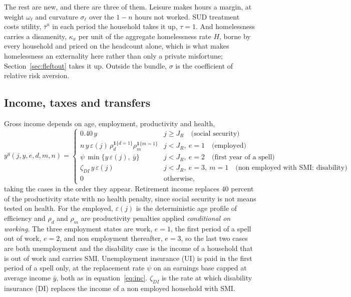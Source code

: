 \documentclass[10pt]{article}
\begin{document}
The rest are new, and there are three of them. Leisure makes hours a margin,
at weight $\omega_{\ell}$ and curvature $\sigma_{\ell}$ over the $1-n$ hours
not worked. SUD treatment costs utility, $\bar\tau^{u}$ in each
period the household takes it up, $\tau=1$. And homelessness carries a
disamenity, $\kappa_x$ per unit of the aggregate homelessness rate $H$, borne by
every household and priced on the headcount alone, which is what makes
homelessness an externality here rather than only a private misfortune;
Section~\ref{sec:fleftout} takes it up. Outside the bundle, $\sigma$ is the
coefficient of relative risk aversion.

\subsection{Income, taxes and transfers}\label{sec:ftaxes}

Gross income depends on age, employment, productivity and health,
\begin{equation}\label{eq:fincome}
y^{g}(j,y,e,d,m,n)=
\begin{cases}
0.40\,y & j\ge J_{R} \quad\text{(social security)}\\[2pt]
n\,y\,\varepsilon(j)\,\rho_{d}^{\mathbf{1}\{d=1\}}\rho_{m}^{\mathbf{1}\{m=1\}}
 & j<J_{R},\ e=1 \quad\text{(employed)}\\[2pt]
\psi\,\min\{y\,\varepsilon(j),\ \bar y\}
 & j<J_{R},\ e=2 \quad\text{(first year of a spell)}\\[2pt]
\zeta_{DI}\,y\,\varepsilon(j) & j<J_{R},\ e=3,\ m=1 \quad\text{(non employed with SMI: disability)}\\[2pt]
0 & \text{otherwise,}
\end{cases}
\end{equation}
taking the cases in the order they appear. Retirement income replaces $40$
percent of the productivity state with no health penalty, since social security
is not means tested on health. For the employed, $\varepsilon(j)$ is
the deterministic age profile of efficiency and $\rho_d$ and
$\rho_m$ are productivity penalties applied \emph{conditional on working}.
The three employment states are work, $e=1$, the first period of a spell
out of work, $e=2$, and non employment thereafter, $e=3$, so the last two cases
are both unemployment and the disability case is the income of a household that
is out of work and carries SMI. Unemployment insurance (UI) is paid in the first period of a spell only, at
the replacement rate $\psi$ on an earnings base capped at average income
$\bar y$, both as in equation~\eqref{eq:inc}. $\zeta_{DI}$ is the rate at which disability
insurance (DI) replaces the income of a non employed household with SMI.
\end{document}
